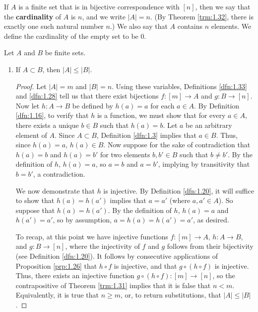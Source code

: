 \documentclass[../main.tex]{subfiles}
\begin{document}
\begin{definition}\label{dfn:1.33}
    If $A$ is a finite set that is in bijective correspondence with $[n]$, then we say that the \textbf{cardinality} of $A$ is $n$, and we write $|A|=n$. (By Theorem \ref{trm:1.32}, there is exactly one such natural number $n$.) We also say that $A$ contains $n$ elements. We define the cardinality of the empty set to be 0.
\end{definition}

\begin{exercise}\label{exr:1.34}
    Let $A$ and $B$ be finite sets.
    \begin{enumerate}[label={\alph*)},ref={\thetheorem\alph*}]
        \item \label{exr:1.34a}If $A\subset B$, then $|A|\leq|B|$.
        \begin{proof}
            Let $|A|=m$ and $|B|=n$. Using these variables, Definitions \ref{dfn:1.33} and \ref{dfn:1.28} tell us that there exist bijections $f:[m]\to A$ and $g:B\to[n]$. Now let $h:A\to B$ be defined by $h(a)=a$ for each $a\in A$. By Definition \ref{dfn:1.16}, to verify that $h$ is a function, we must show that for every $a\in A$, there exists a unique $b\in B$ such that $h(a)=b$. Let $a$ be an arbitrary element of $A$. Since $A\subset B$, Definition \ref{dfn:1.3} implies that $a\in B$. Thus, since $h(a)=a$, $h(a)\in B$. Now suppose for the sake of contradiction that $h(a)=b$ and $h(a)=b'$ for two elements $b,b'\in B$ such that $b\neq b'$. By the definition of $h$, $h(a)=a$, so $a=b$ and $a=b'$, implying by transitivity that $b=b'$, a contradiction.\par
            We now demonstrate that $h$ is injective. By Definition \ref{dfn:1.20}, it will suffice to show that $h(a)=h(a')$ implies that $a=a'$ (where $a,a'\in A$). So suppose that $h(a)=h(a')$. By the definition of $h$, $h(a)=a$ and $h(a')=a'$, so by assumption, $a=h(a)=h(a')=a'$, as desired.\par
            To recap, at this point we have injective functions $f:[m]\to A$, $h:A\to B$, and $g:B\to [n]$, where the injectivity of $f$ and $g$ follows from their bijectivity (see Definition \ref{dfn:1.20}). It follows by consecutive applications of Proposition \ref{prp:1.26} that $h\circ f$ is injective, and that $g\circ (h\circ f)$ is injective. Thus, there exists an injective function $g\circ (h\circ f):[m]\to[n]$, so the contrapositive of Theorem \ref{trm:1.31} implies that it is false that $n<m$. Equivalently, it is true that $n\geq m$, or, to return substitutions, that $|A|\leq|B|$.

\end{proof}
\end{enumerate}
\end{exercise}
\end{document}
